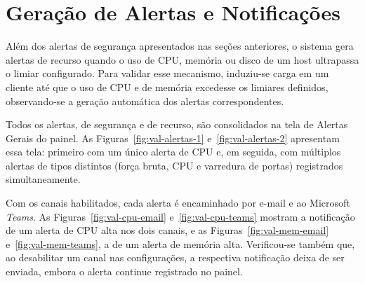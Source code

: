 \documentclass[
    12pt
    ,oneside
    ,a4paper
    ,chapter=TITLE
    ,section=TITLE
    ,sumario=abnt-6027-2012]{abntex2}
\begin{document}
\begin{figure}[H]
\end{figure}

\section{Geração de Alertas e Notificações}
\label{sec:valid-notificacoes}

Além dos alertas de segurança apresentados nas seções anteriores, o sistema gera alertas de recurso quando o uso de CPU, memória ou disco de um host ultrapassa o limiar configurado. Para validar esse mecanismo, induziu-se carga em um cliente até que o uso de CPU e de memória excedesse os limiares definidos, observando-se a geração automática dos alertas correspondentes.

Todos os alertas, de segurança e de recurso, são consolidados na tela de Alertas Gerais do painel. As Figuras~\ref{fig:val-alertas-1} e~\ref{fig:val-alertas-2} apresentam essa tela: primeiro com um único alerta de CPU e, em seguida, com múltiplos alertas de tipos distintos (força bruta, CPU e varredura de portas) registrados simultaneamente.

Com os canais habilitados, cada alerta é encaminhado por e-mail e ao Microsoft \textit{Teams}. As Figuras~\ref{fig:val-cpu-email} e~\ref{fig:val-cpu-teams} mostram a notificação de um alerta de CPU alta nos dois canais, e as Figuras~\ref{fig:val-mem-email} e~\ref{fig:val-mem-teams}, a de um alerta de memória alta. Verificou-se também que, ao desabilitar um canal nas configurações, a respectiva notificação deixa de ser enviada, embora o alerta continue registrado no painel.

\begin{figure}[H]
\end{figure}

\begin{figure}[H]
\end{figure}

\begin{figure}[H]
\end{figure}
\end{document}
